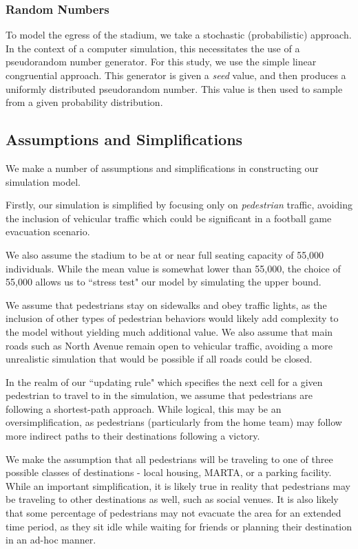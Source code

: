 \documentclass[12pt]{article}
\begin{document}
\subsubsection{Random Numbers}
To model the egress of the stadium, we take a stochastic (probabilistic)
approach. In the context of a computer simulation, this necessitates the use of
a pseudorandom number generator. For this study, we use the simple linear
congruential approach. This generator is given a \textit{seed} value,
and then produces a uniformly distributed pseudorandom number. This value is
then used to sample from a given probability distribution.

\subsection{Assumptions and Simplifications}
We make a number of assumptions and simplifications in constructing our
simulation model.

Firstly, our simulation is simplified by focusing only on
\textit{pedestrian} traffic, avoiding the inclusion of vehicular traffic which
could be significant in a football game evacuation scenario.

We also assume the stadium to be at or near full seating capacity of 55,000
individuals. While the mean value is somewhat lower than 55,000, the choice
of 55,000 allows us to ``stress test" our model by simulating the upper bound.

We assume that pedestrians stay on sidewalks and obey traffic lights, as the
inclusion of other types of pedestrian behaviors would likely add complexity
to the model without yielding much additional value. We also assume that main
roads such as North Avenue remain open to vehicular traffic, avoiding a more
unrealistic simulation that would be possible if all roads could be closed.

In the realm of our “updating rule" which specifies the next cell for a given
pedestrian to travel to in the simulation, we assume that pedestrians are
following a shortest-path approach. While logical, this may be an
oversimplification, as pedestrians (particularly from the home team) may follow
more indirect paths to their destinations following a victory.

We make the assumption that all pedestrians will be traveling to one of three
possible classes of destinations - local housing, MARTA, or a parking facility.
While an important simplification, it is likely true in reality that pedestrians
may be traveling to other destinations as well, such as social venues. It is
also likely that some percentage of pedestrians may not evacuate the area for
an extended time period, as they sit idle while waiting for friends or planning
their destination in an ad-hoc manner.
\end{document}
